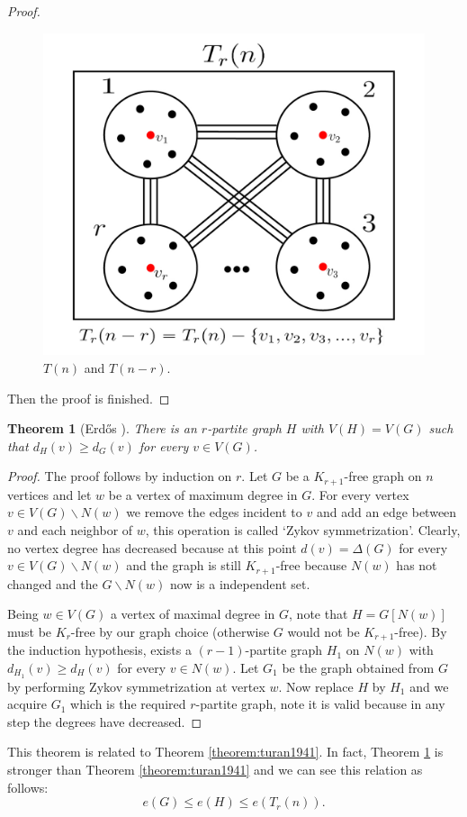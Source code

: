 \documentclass[12pt,twoside,a4paper,bibliography=totocnumbered]{book}
\numberwithin{equation}{section}
\let\setminus=\smallsetminus
\newtheorem{theorem}             {Theorem}[section]
\theoremstyle{remark}
\begin{document}
\begin{proof}
 \begin{figure}[H]
     \centering
     \includegraphics[scale=1]{Figuras/t(n)-and-t(n-r)}
     \caption{$T(n)$ and $T(n-r)$.}
     \label{fig:t(n)-and-t(n-r)}
\end{figure}
Then the proof is finished.
\end{proof}

\begin{theorem}[{Erd\H{o}s \cite{Er70}}]\label{theorem:erdos1970} There is an $ r$-partite graph $H$ with $V(H) = V(G)$ such that $d_H(v) \geq d_G(v)$ for every $v \in V(G)$.\\
\end{theorem}

\begin{proof}
The proof follows by induction on $r$. Let $G$ be a $ K_{r+1}$-free graph on $n$ vertices and let $w$ be a vertex of maximum degree in $G$. For every vertex $v \in V(G)\setminus N(w)$ we remove the edges incident to $v$ and add an edge between $v$ and each neighbor of $w$, this operation is called `Zykov symmetrization'. Clearly, no vertex degree has decreased because at this point $d(v) = \Delta(G)$ for every $v \in V(G)\setminus N(w)$ and the graph is still $K_{r+1}$-free because $N(w)$ has not changed and the $G\setminus N(w)$ now is a independent set.

Being $w\in V(G)$ a vertex of maximal degree in $G$, note that $H=G[N(w)]$ must be $K_r$-free by our graph choice (otherwise $G$ would not be $K_{r+1}$-free). By the induction hypothesis, exists a $(r-1)$-partite graph $H_1$ on $N(w)$ with $d_{H_1}(v) \geq d_{H}(v)$ for every $v \in N(w)$. Let $G_1$ be the graph obtained from $G$ by performing Zykov symmetrization at vertex $w$. Now replace $H$ by $H_1$ and we acquire $G_1$ which is the required $r$-partite graph, note it is valid because in any step the degrees have decreased.
\end{proof}
This theorem is related to Theorem \ref{theorem:turan1941}. In fact, Theorem \ref{theorem:erdos1970} is stronger than Theorem \ref{theorem:turan1941} and we can see this relation as follows: $$e(G) \leq e(H) \leq e(T_r(n)).$$
\end{document}
